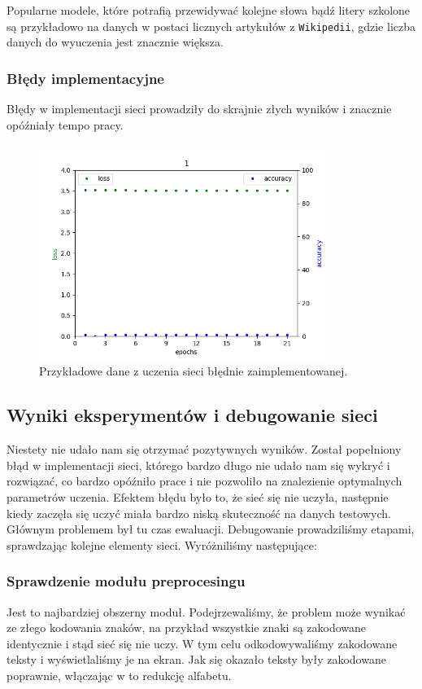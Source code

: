 Popularne modele, które potrafią przewidywać kolejne słowa bądź litery szkolone są przykładowo na danych w postaci licznych
artykułów z \texttt{Wikipedii}, gdzie liczba danych do wyuczenia jest znacznie większa.

\newpage
\subsubsection{Błędy implementacyjne}
Błędy w implementacji sieci prowadziły do skrajnie złych wyników i znacznie opóźniały tempo pracy.
\begin{figure}[H]
	\centering
	\includegraphics[height=7cm]{./images/result1.png}
	\caption{Przykładowe dane z uczenia sieci błędnie zaimplementowanej.}
	\label{fig:test5}
	\end{figure}

\subsection{Wyniki eksperymentów i debugowanie sieci}
Niestety nie udało nam się otrzymać pozytywnych wyników. Został popełniony błąd w implementacji sieci,
którego bardzo długo nie udało nam się wykryć i rozwiązać, co bardzo opóźniło prace i nie pozwoliło na znalezienie
optymalnych parametrów uczenia. Efektem błędu było to, że sieć się nie uczyła, następnie kiedy zaczęła się
uczyć miała bardzo niską skuteczność na danych testowych. Głównym problemem był tu czas ewaluacji.
Debugowanie prowadziliśmy etapami, sprawdzając kolejne elementy sieci. Wyróżniliśmy następujące:

\subsubsection{Sprawdzenie modułu preprocesingu}
	Jest to najbardziej obszerny moduł. Podejrzewaliśmy, że problem może wynikać ze złego kodowania znaków,
	na przykład wszystkie znaki są zakodowane identycznie i stąd sieć się nie uczy. W tym celu odkodowywaliśmy
	zakodowane teksty i wyświetlaliśmy je na ekran. Jak się okazało teksty były zakodowane poprawnie, włączając w
	to redukcję alfabetu.

